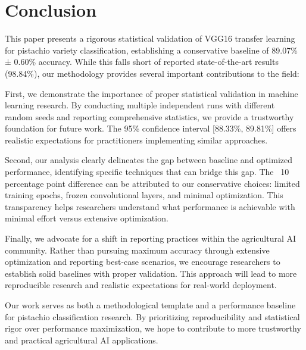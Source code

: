 \documentclass[conference]{IEEEtran}
\begin{document}
\section{Conclusion}

This paper presents a rigorous statistical validation of VGG16 transfer learning for pistachio variety classification, establishing a conservative baseline of 89.07\% ± 0.60\% accuracy. While this falls short of reported state-of-the-art results (98.84\%), our methodology provides several important contributions to the field:

First, we demonstrate the importance of proper statistical validation in machine learning research. By conducting multiple independent runs with different random seeds and reporting comprehensive statistics, we provide a trustworthy foundation for future work. The 95\% confidence interval [88.33\%, 89.81\%] offers realistic expectations for practitioners implementing similar approaches.

Second, our analysis clearly delineates the gap between baseline and optimized performance, identifying specific techniques that can bridge this gap. The ~10 percentage point difference can be attributed to our conservative choices: limited training epochs, frozen convolutional layers, and minimal optimization. This transparency helps researchers understand what performance is achievable with minimal effort versus extensive optimization.

Finally, we advocate for a shift in reporting practices within the agricultural AI community. Rather than pursuing maximum accuracy through extensive optimization and reporting best-case scenarios, we encourage researchers to establish solid baselines with proper validation. This approach will lead to more reproducible research and realistic expectations for real-world deployment.

Our work serves as both a methodological template and a performance baseline for pistachio classification research. By prioritizing reproducibility and statistical rigor over performance maximization, we hope to contribute to more trustworthy and practical agricultural AI applications.
\end{document}
